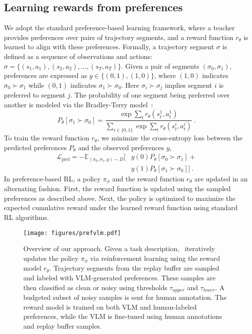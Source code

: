 \subsection{Learning rewards from preferences} \label{sec:pref}
We adopt the standard preference-based learning framework, where a teacher provides preferences over pairs of trajectory segments, and a reward function $r_\theta$ is learned to align with these preferences. Formally, a trajectory segment $\sigma$ is defined as a sequence of observations and actions: $\sigma = \{(s_1, a_1), (s_2, a_2),...,(s_T, a_T)\}$. Given a pair of segments $(\sigma_0, \sigma_1)$, preferences are expressed as $y \in \{(0,1), (1,0)\}$, where $(1,0)$ indicates $\sigma_0 \succ \sigma_1$ while $(0,1)$ indicates $\sigma_1 \succ \sigma_0$. Here $\sigma_i \succ \sigma_j$ implies segment $i$ is preferred to segment $j$. The probability of one segment being preferred over another is modeled via the Bradley-Terry model~\cite{bradley1952rank}:
\begin{equation}
\label{eq:btmodel}
    P_{\theta}[\sigma_1 \succ \sigma_0] = \frac{\exp{\sum_{t}} r_{\theta}(s_t^1, a_t^1)}{\sum_{i\in\{0,1\}}\exp{\sum_{t}} r_{\theta}(s_t^i, a_t^i)} \ .
\end{equation}
To train the reward function $r_\theta$, we minimize the cross-entropy loss between the predicted preferences $P_{\theta}$ and the observed preferences $y$,
\begin{equation}\label{eq:btloss}
\begin{split}
    \mathcal{L}_{\text{pref}} = - \mathbb{E}_{(\sigma_0,\sigma_1,y)\sim D} \big[&y(0)P_\theta[\sigma_0 \succ\sigma_1] + \\ &y(1)P_\theta[\sigma_1\succ\sigma_0]\big] \ .
\end{split}
\end{equation}
In preference-based RL, a policy $\pi_\phi$ and the reward
function $r_\theta$ are updated in an alternating fashion. First, the reward function is updated using the sampled preferences as described above. Next, the policy is optimized to maximize the expected cumulative reward under the learned reward function using standard RL algorithms. 

\begin{figure*}[!t]
    \centering
    \texttt{[image: figures/prefvlm.pdf]}
    \caption{Overview of our approach. Given a task description, \algo~iteratively updates the policy $\pi_\phi$ via reinforcement learning using the reward model $r_\theta$. Trajectory segments from the replay buffer are sampled and labeled with VLM-generated preferences. These samples are then classified as clean or noisy using thresholds $\tau_{upper}$ and $\tau_{lower}$. A budgeted subset of noisy samples is sent for human annotation. The reward model is trained on both VLM and human-labeled preferences, while the VLM is fine-tuned using human annotations and replay buffer samples. 
    }
    \label{fig:overview}
\end{figure*}
